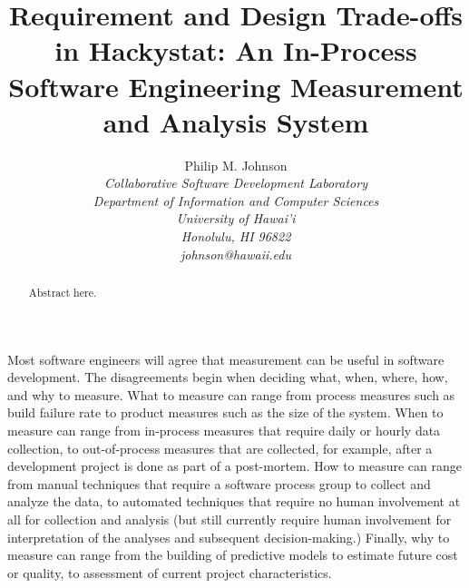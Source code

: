 \documentclass[10pt,twocolumn]{article}
\begin{document}
\title{Requirement and Design Trade-offs in Hackystat: An In-Process
Software Engineering Measurement and Analysis System}

\author{Philip M. Johnson \\
\em  Collaborative Software Development Laboratory \\
\em  Department of Information and Computer Sciences \\
\em  University of Hawai'i \\
\em  Honolulu, HI 96822 \\
\em  johnson@hawaii.edu \\
}
\maketitle
\thispagestyle{empty}

\begin{abstract}
Abstract here.
\end{abstract}

\label{sec:intro}
Most software engineers will agree that measurement can be useful in
software development.  The disagreements begin when deciding what, when,
where, how, and why to measure.  What to measure can range from process
measures such as build failure rate to product measures such as the size
of the system.  When to measure can range from in-process measures that
require daily or hourly data collection, to out-of-process measures that
are collected, for example, after a development project is done as part of
a post-mortem.  How to measure can range from manual techniques that
require a software process group to collect and analyze the data, to
automated techniques that require no human involvement at all for
collection and analysis (but still currently require human involvement for
interpretation of the analyses and subsequent decision-making.)  Finally,
why to measure can range from the building of predictive models to estimate
future cost or quality, to assessment of current project
characteristics.
\end{document}
